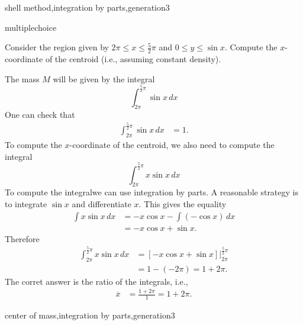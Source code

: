 \documentclass{ximera}
\begin{document}
\begin{question}[shelllogibp001]
\begin{feedback}
\end{feedback}
\begin{keywords}
shell method,integration by parts,generation3
\end{keywords}
\end{question}

\begin{question}[COMsinibp001]
\begin{type}
multiplechoice
\end{type}
Consider the region given by \(2 \pi \leq x \leq \frac{5}{2} \pi\) and \(0 \leq y \leq \sin {x}\).
Compute the \(x\)-coordinate of the centroid (i.e., assuming constant density).
\begin{multiplechoice}
\choice{\(\displaystyle 3 \pi\)}
\choice{\(\displaystyle 4 \pi\)}
\end{multiplechoice}
\begin{feedback}
The mass  \(M\) will be given by the integral
\[ \int_{2 \pi}^{\frac{5}{2} \pi} \sin {x}\, dx \]
 One can check that
\[ \begin{aligned} \int_{2 \pi}^{\frac{5}{2} \pi} \sin {x}\, dx & = 1. \end{aligned} \]
To compute the  \(x\)-coordinate of the centroid, we also need to compute the integral 
\[ \int_{2 \pi}^{\frac{5}{2} \pi} x \sin {x}\, dx \]
 To compute the integralwe can use integration by parts. A reasonable strategy is to integrate  \(\sin {x}\) and differentiate  \(x\).
 This gives the equality
\[ \begin{aligned} \int x \sin {x}\, dx & = - x \cos {x} - \int \left(- \cos {x}\right)\, dx \\
 & = - x \cos {x} + \sin {x}. \end{aligned} \]
Therefore 
\[ \begin{aligned} \int_{2 \pi}^{\frac{5}{2} \pi} x \sin {x}\, dx & = \left. \left[- x \cos {x} + \sin {x} \right] \right|_{2 \pi}^{\frac{5}{2} \pi}\\ & = 1 - \left(- 2 \pi \right) = 1 + 2 \pi. \end{aligned} \]
The corret answer is the ratio of the integrals, i.e.,
\[ \begin{aligned} \overline{x} & = \frac{1 + 2 \pi}{1} = 1 + 2 \pi. \end{aligned} \]
\end{feedback}
\begin{keywords}
center of mass,integration by parts,generation3
\end{keywords}
\end{question}
\end{document}
